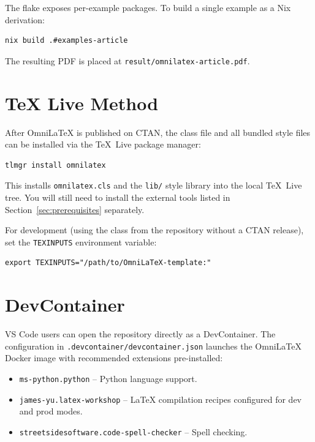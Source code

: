 The flake exposes per-example packages.  To build a single example as a Nix
derivation:

\begin{verbatim}
nix build .#examples-article
\end{verbatim}

The resulting PDF is placed at \texttt{result/omnilatex-article.pdf}.

\section{TeX Live Method}

After OmniLaTeX is published on CTAN, the class file and all bundled style
files can be installed via the TeX~Live package manager:

\begin{verbatim}
tlmgr install omnilatex
\end{verbatim}

This installs \texttt{omnilatex.cls} and the \texttt{lib/} style library into
the local TeX~Live tree.  You will still need to install the external tools
listed in Section~\ref{sec:prerequisites} separately.

For development (using the class from the repository without a CTAN release),
set the \texttt{TEXINPUTS} environment variable:

\begin{verbatim}
export TEXINPUTS="/path/to/OmniLaTeX-template:"
\end{verbatim}

\section{DevContainer}

VS Code users can open the repository directly as a DevContainer.  The
configuration in \texttt{.devcontainer/devcontainer.json} launches the
OmniLaTeX Docker image with recommended extensions pre-installed:

\begin{itemize}
    \item \texttt{ms-python.python} -- Python language support.
    \item \texttt{james-yu.latex-workshop} -- \LaTeX{} compilation recipes
          configured for dev and prod modes.
    \item \texttt{streetsidesoftware.code-spell-checker} -- Spell checking.
\end{itemize}

